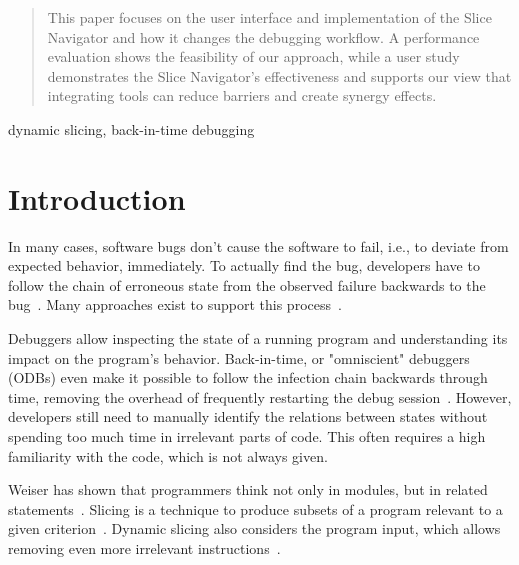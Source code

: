 \documentclass[
			english,
			review,
			]{elsarticle}
\begin{document}
\begin{frontmatter}
\begin{abstract}
This paper focuses on the user interface and implementation of the Slice Navigator and how it changes the debugging workflow. 
A performance evaluation shows the feasibility of our approach, while a user study demonstrates the Slice Navigator's effectiveness and supports our view that integrating tools can reduce barriers and create synergy effects.
\end{abstract}

\begin{keyword}
dynamic slicing, back-in-time debugging
\end{keyword}

\end{frontmatter}

\linenumbers

\section{Introduction}
\label{sec:introduction}

In many cases, software bugs don't cause the software to fail, i.e., to deviate from expected behavior, immediately.
To actually find the bug, developers have to follow the chain of erroneous state from the observed failure backwards to the bug~\cite{zeller_why_2009}.
Many approaches exist to support this process~\cite{wong_survey_2016}.

Debuggers allow inspecting the state of a running program and understanding its impact on the program's behavior.
Back-in-time, or "omniscient" debuggers (ODBs) even make it possible to follow the infection chain backwards through time, removing the overhead of frequently restarting the debug session~\cite{lewis_debugging_2003}.
However, developers still need to manually identify the relations between states without spending too much time in irrelevant parts of code.
This often requires a high familiarity with the code, which is not always given.
%

Weiser has shown that programmers think not only in modules, but in related statements~\cite{weiser_programmers_1982}.
Slicing is a technique to produce subsets of a program relevant to a given criterion~\cite{weiser_program_1981}.
Dynamic slicing also considers the program input, which allows removing even more irrelevant instructions~\cite{korel_dynamic_1990, agrawal_dynamic_1990}.
\end{document}
